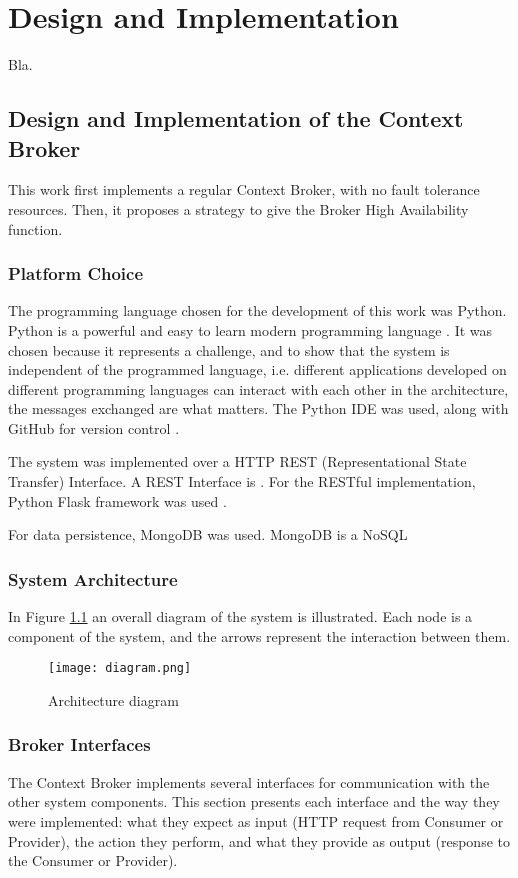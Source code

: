 \chapter{Design and Implementation}
\label{chap:implementation}
Bla.

\section{Design and Implementation of the Context Broker}
\label{sec:broker}
This work first implements a regular Context Broker, with no fault tolerance resources. Then, it proposes a strategy to give the Broker High Availability function.
 
\subsection{Platform Choice}
The programming language chosen for the development of this work was Python. Python is a powerful and easy to learn modern programming language \cite{python}. It was chosen because it represents a challenge, and to show that the system is independent of the programmed language, i.e. different applications developed on different programming languages can interact with each other in the architecture, the messages exchanged are what matters. The Python IDE \cite{pycharm} was used, along with GitHub for version control \cite{github}.

The system was implemented over a HTTP REST (Representational State Transfer) Interface. A REST Interface is \cite{fielding2002principled}. For the RESTful implementation, Python Flask framework was used \cite{flask}.

For data persistence, MongoDB was used. MongoDB is a NoSQL 

\subsection{System Architecture}
In Figure \ref{fig:diagram} an overall diagram of the system is illustrated. Each node is a component of the system, and the arrows represent the interaction between them.

\begin{figure}[h]
	\centering
	\texttt{[image: diagram.png]}
	\caption{Architecture diagram}
	\label{fig:diagram}
	
\end{figure}


\subsection{Broker Interfaces}
The Context Broker implements several interfaces for communication with the other system components. This section presents each interface and the way they were implemented: what they expect as input (HTTP request from Consumer or Provider), the action they perform, and what they provide as output (response to the Consumer or Provider).


